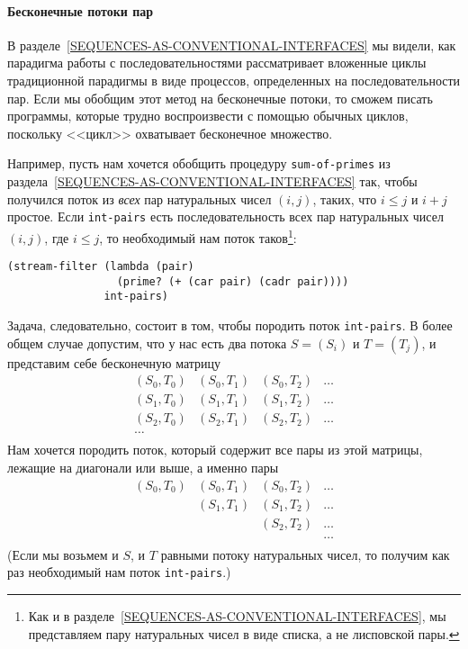 \paragraph{Бесконечные потоки пар}


В разделе~\ref{SEQUENCES-AS-CONVENTIONAL-INTERFACES} мы видели, как
парадигма работы с последовательностями рассматривает вложенные циклы
традиционной парадигмы в виде процессов, определенных на
последовательности пар.  Если мы обобщим этот метод на бесконечные
потоки, то сможем писать программы, которые трудно воспроизвести
с помощью обычных циклов, поскольку <<цикл>> охватывает бесконечное
множество.

Например, пусть нам хочется обобщить процедуру
{\tt sum-of-primes} из
раздела~\ref{SEQUENCES-AS-CONVENTIONAL-INTERFACES} так, чтобы
получился поток из {\em всех} пар натуральных чисел $(i,j)$, таких, что
$i \leq j$ и $i+j$ простое.  Если
{\tt int-pairs} есть последовательность всех пар натуральных
чисел $(i,j)$, где $i \leq j$, то необходимый
нам поток таков\footnote{Как и в
разделе~\ref{SEQUENCES-AS-CONVENTIONAL-INTERFACES}, мы
представляем пару натуральных чисел в виде списка, а не лисповской
пары.
}:

\begin{Verbatim}[fontsize=\small]
(stream-filter (lambda (pair)
                 (prime? (+ (car pair) (cadr pair))))
               int-pairs)
\end{Verbatim}

Задача, следовательно, состоит в том, чтобы породить
поток {\tt int-pairs}.  В более общем случае допустим, что у
нас есть два потока $S = (S_i)$ и $T = (T_j)$, и
представим себе бесконечную матрицу
$$
\begin{array}{cccc}
(S_0, T_0) & (S_0, T_1) & (S_0, T_2) & \ldots\\
(S_1, T_0) & (S_1, T_1) & (S_1, T_2) & \ldots\\
(S_2, T_0) & (S_2, T_1) & (S_2, T_2) & \ldots\\
\ldots\\
\end{array}
$$
Нам хочется породить поток, который содержит все пары из этой матрицы,
лежащие на диагонали или выше, а именно пары
$$
\begin{array}{cccc}
(S_0, T_0) & (S_0, T_1) & (S_0, T_2) & \ldots\\
           & (S_1, T_1) & (S_1, T_2) & \ldots\\
           &            & (S_2, T_2) & \ldots\\
           &            &            & \ldots\\
\end{array}
$$
(Если мы возьмем и $S$, и $T$ равными потоку
натуральных чисел, то получим как раз необходимый нам поток
{\tt int-pairs}.)

